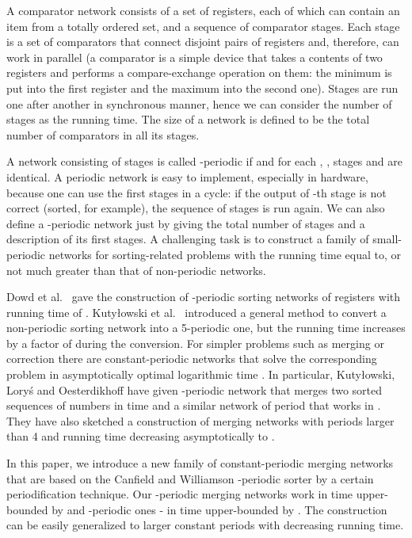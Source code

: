 \documentclass{llncs}
\begin{document}
A comparator network consists of a set of  registers, each of which can
contain an item from a totally ordered set, and a sequence of
comparator stages.  Each stage is a set of comparators that connect
disjoint pairs of registers and, therefore, can work in parallel (a
comparator is a simple device that takes a contents of two registers
and performs a compare-exchange operation on them: the minimum is put
into the first register and the maximum into the second one). Stages
are run one after another in synchronous manner, hence we can consider
the number of stages as the running time. The size of a network is 
defined to be the total number of comparators in all its stages.

A network  consisting of stages  is called -periodic
if  and for each , , stages  and  are
identical.  A periodic network is easy to implement, especially in hardware,
because one can use the first  stages in a cycle: if the output of -th
stage is not correct (sorted, for example), the sequence of  stages is run
again. We can also define a -periodic network just by giving the total
number of stages and a description of its first  stages. A challenging task
is to construct a family of small-periodic networks for sorting-related
problems with the running time equal to, or not much greater than that of
non-periodic networks.

Dowd et al.\ \cite{dpsr} gave the construction of -periodic sorting
networks of  registers with running time of .  Kuty{\l}owski et
al.\ \cite{klow} introduced a general method to convert a non-periodic sorting
network into a 5-periodic one, but the running time increases by a factor of
 during the conversion. For simpler problems such as merging or
correction there are constant-periodic networks that solve the corresponding
problem in asymptotically optimal logarithmic time \cite{klo,p}. In
particular, Kuty{\l}owski, Lory{\'s} and Oesterdikhoff \cite{klo} have given
-periodic network that merges two sorted sequences of  numbers in time
 and a similar network of period  that works in .
They have also sketched a construction of merging networks with periods larger
than 4 and running time decreasing asymptotically to .

In this paper, we introduce a new family of constant-periodic merging
networks that are based on the Canfield and Williamson -periodic sorter \cite{cw} by a certain periodification technique.
Our -periodic merging networks work in time upper-bounded by  and -periodic ones - in time upper-bounded by . The
construction can be easily generalized to larger constant periods with
decreasing running time.
\end{document}
